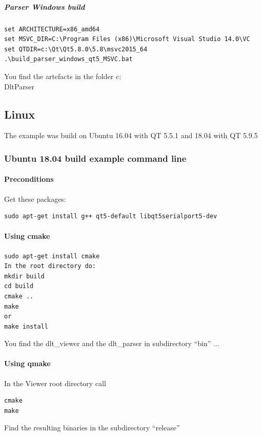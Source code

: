\documentclass[a4paper,11pt]{article}
\begin{document}
\subparagraph{Parser Windows build}

\begin{verbatim}
set ARCHITECTURE=x86_amd64
set MSVC_DIR=C:\Program Files (x86)\Microsoft Visual Studio 14.0\VC
set QTDIR=c:\Qt\Qt5.8.0\5.8\msvc2015_64
.\build_parser_windows_qt5_MSVC.bat
\end{verbatim}

You find the artefacts in the folder c:\\DltParser

\subsection{Linux}

The example was build on Ubuntu 16.04 with QT 5.5.1 and 18.04 with QT 5.9.5

\subsubsection{Ubuntu 18.04 build example command line}
\paragraph{Preconditions}
Get these packages:
\begin{verbatim}
sudo apt-get install g++ qt5-default libqt5serialport5-dev
\end{verbatim}

\paragraph{Using cmake}
\begin{verbatim}
sudo apt-get install cmake
In the root directory do:
mkdir build
cd build
cmake ..
make
or
make install
\end{verbatim}
You find the dlt\_viewer and the dlt\_parser in subdirectory ``bin'' ...

\paragraph{Using qmake}
In the Viewer root directory call

\begin{verbatim}
cmake
make
\end{verbatim}

Find the resulting binaries in the subdirectory ``release''
\end{document}
